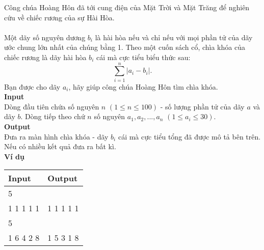 Công chúa Hoàng Hôn đã tới cung điện của Mặt Trời và Mặt Trăng để nghiên cứu về chiếc rương của sự Hài Hòa.
\\
\\
Một dãy số nguyên dương $b_{i}$ là hài hòa nếu và chỉ nếu với mọi phần tử của dãy ước chung lớn nhất của chúng bằng 1. Theo một cuốn sách cổ, chìa khóa của chiếc rương là dãy hài hòa $b_{i}$ cái mà cực tiểu biểu thức sau:
\[
    \sum_{i = 1}^{n} |a_{i} - b_{i}|.
\]
Bạn được cho dãy $a_{i}$, hãy giúp công chúa Hoàng Hôn tìm chìa khóa.
\\

\textbf{Input}
\\
Dòng đầu tiên chứa số nguyên $n$ $(1 \leq n \leq 100)$ - số lượng phần tử của dãy $a$ và dãy $b$. Dòng tiếp theo chứ $n$ số nguyên $a_{1},a_{2},...,a_{n}$ $(1 \leq a_{i} \leq 30)$.
\\

\textbf{Output}
\\
Đưa ra màn hình chìa khóa - dãy $b_{i}$ cái mà cực tiểu tổng đã được mô tả bên trên. Nếu có nhiều kết quả đưa ra bất kì.
\\

\textbf{Ví dụ}
\begin{table}[h!]
    \begin{center}
        \begin{tabular}{|p{7cm}|p{5cm}|}
            \hline
            \textbf{Input} & \textbf{Output} \\ 
            \hline
            5 & \\
            1 1 1 1 1 & 1 1 1 1 1 \\
            \hline
            5 & \\
            1 6 4 2 8 & 1 5 3 1 8 \\
            \hline
        \end{tabular}
    \end{center}
\end{table}


